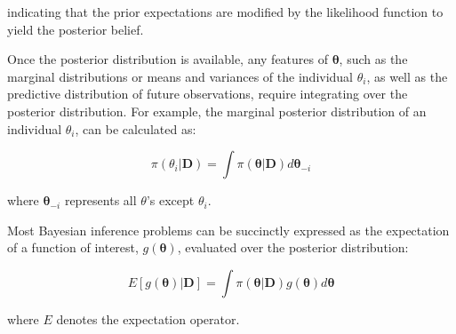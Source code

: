 indicating that the prior expectations are modified by the likelihood function to yield the posterior belief.

Once the posterior distribution is available, any features of $\boldsymbol{\theta}$, such as the marginal distributions or means and variances of the individual $\theta_i$, as well as the predictive distribution of future observations, require integrating over the posterior distribution. For example, the marginal posterior distribution of an individual $\theta_i$, can be calculated as:

\begin{equation}
\pi(\theta_i | \mathbf{D}) = \int \pi(\boldsymbol{\theta} | \mathbf{D}) d\boldsymbol{\theta}_{-i}
\end{equation}

where $\boldsymbol{\theta}_{-i}$ represents all $\theta$'s except $\theta_i$.

Most Bayesian inference problems can be succinctly expressed as the expectation of a function of interest, $g(\boldsymbol{\theta})$, evaluated over the posterior distribution:

\begin{equation}
E[g(\boldsymbol{\theta}) | \mathbf{D}] = \int \pi(\boldsymbol{\theta} | \mathbf{D})g(\boldsymbol{\theta}) d\boldsymbol{\theta}
\end{equation}

where $E$ denotes the expectation operator.

